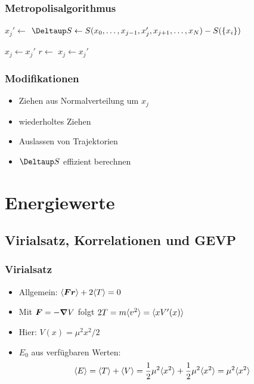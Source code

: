 \documentclass[ngerman, fleqn]{beamer}
\newcommand\timesites{N}
\begin{document}
\begin{frame}
    \frametitle{Metropolisalgorithmus}
    
    \begin{algorithmic}
        \For{$j \gets 1, \ldots, \timesites$}
            \State $x_j' \gets$ 
            \State $\Deltaup S \gets S(x_0, \ldots, x_{j-1}, x_j',
            x_{j+1}, \ldots, x_\timesites) - S(\{x_i\})$

                \State $x_j \gets x_j'$
            \Else
                \State $r \gets$ 
                    \State $x_j \gets x_j'$
                \EndIf
            \EndIf
        \EndFor
    \end{algorithmic}
\end{frame}

\begin{frame}
    \frametitle{Modifikationen}

    \begin{itemize}
        \item
            Ziehen aus Normalverteilung um $x_j$

        \item
            wiederholtes Ziehen

        \item
            Auslassen von Trajektorien

        \item
            $\Deltaup S$ effizient berechnen
    \end{itemize}
\end{frame}

\section{Energiewerte}
\subsection{Virialsatz, Korrelationen und GEVP}

\begin{frame}
    \frametitle{Virialsatz}

    \begin{itemize}
    
        \item
    Allgemein: $\langle \boldsymbol{F} \boldsymbol{r} \rangle + 2 \langle T \rangle = 0$

\item
    Mit $\boldsymbol{F} = - \boldsymbol{\nabla} V$ folgt $2 T = m \langle v^2 \rangle = \langle x V'(x) \rangle$

\item
    Hier: $V(x) = \mu^2 x^2 /2$

\item
    $E_0$ aus verfügbaren Werten:
    \[
        \langle E \rangle = \langle T \rangle + \langle V \rangle
        = \frac12 \mu^2 \langle x^2 \rangle + \frac12 \mu^2 \langle x^2 \rangle
        = \mu^2 \langle x^2 \rangle
    \]
    \end{itemize}
\end{frame}
\end{document}
